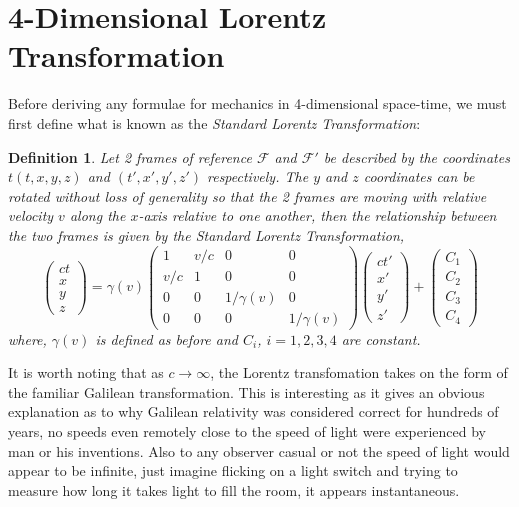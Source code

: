 \documentclass[a4paper,12pt,draft]{report}
\newtheorem{definition}{Definition}
\begin{document}
\section{4-Dimensional Lorentz Transformation}

Before deriving any formulae for mechanics in 4-dimensional space-time, we must first define what is known as the \emph{Standard Lorentz Transformation}:

\begin{definition}
Let 2 frames of reference $\mathcal{F}$ and $\mathcal{F'}$ be described by the coordinates $t(t, x, y, z)$ and $(t', x', y', z')$ respectively. The $y$ and $z$ coordinates can be rotated without loss of generality so that the 2 frames are moving with relative velocity $v$ along the $x$-axis relative to one another, then the relationship between the two frames is given by the Standard Lorentz Transformation,
$$
\begin{pmatrix}ct\\x\\y\\z\end{pmatrix} = \gamma(v)
\begin{pmatrix}
1 & v/c & 0 & 0\\
v/c & 1 & 0 & 0\\
0 & 0 & 1/\gamma(v) & 0\\
0 & 0 & 0 & 1/\gamma(v)
\end{pmatrix}
\begin{pmatrix}ct'\\x'\\y'\\z'\end{pmatrix} + \begin{pmatrix}C_1\\C_2\\C_3\\C_4\end{pmatrix}
$$
where, $\gamma(v)$ is defined as before and $C_i$, $i = 1, 2, 3, 4$ are constant.
\end{definition}
It is worth noting that as $c \rightarrow \infty$, the Lorentz transfomation takes on the form of the familiar Galilean transformation. This is interesting as it gives an obvious explanation as to why Galilean relativity was considered correct for hundreds of years, no speeds even remotely close to the speed of light were experienced by man or his inventions. Also to any observer casual or not the speed of light would appear to be infinite, just imagine flicking on a light switch and trying to measure how long it takes light to fill the room, it appears instantaneous.
\end{document}
